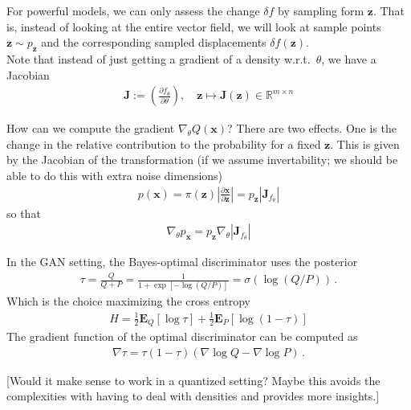 \documentclass{article}
\newcommand{\Edata}{\E_{P}}
\newcommand{\Emodel}{\E_{Q}}
\renewcommand{\Re}{{\mathbb R}}
\newcommand{\E}{{\mathbf E}}
\newcommand{\z}{{\mathbf z}}
\newcommand{\x}{{\mathbf x}}
\begin{document}
For powerful models, we can only assess the change $\delta f$ by sampling form $\z$. That is, instead of looking at the entire vector field, we will look at sample points $\z \sim p_\z$ and the corresponding sampled displacements $\delta f(\z)$.\\

Note that instead of just getting a gradient of a density w.r.t.~$\theta$, we have a Jacobian
\begin{align}
\mathbf J := \left( \frac{\partial f_\theta}{\partial \theta} \right), \quad \z \mapsto \mathbf J(\z) \in \Re^{m \times n}
\end{align} 

How can we compute the gradient $\nabla_\theta Q(\x)$? There are two effects. One is the change in the relative contribution to the probability for a fixed $\z$. This is given by the Jacobian of the transformation (if we assume invertability; we should be able to do this with extra noise dimensions)
\begin{align}
p(\x) = \pi(\z) \left| \frac{\partial \x}{\partial \z} \right| = p_\z \left| \mathbf J_{f_\theta} \right|
\end{align}
so that 
\begin{align}
\nabla_\theta p_\x = p_\z \nabla_\theta \left| \mathbf J_{f_\theta} \right|
\end{align}


\newpage

In the GAN setting, the Bayes-optimal discriminator uses the posterior
\begin{align}
\tau =  \frac{Q}{Q+P} = \frac{1}{1+ \exp\left[ - \log (Q/P) \right]} = \sigma\left(\log (Q/P) \right) \,.
\end{align}
Which is the choice maximizing the cross entropy
\begin{align}
H = \frac 12 \Emodel \left[ \log \tau  \right] + \frac 12 \Edata \left[ \log (1-\tau) \right]
\end{align}
The gradient function of the optimal discriminator can be computed as 
\begin{align}
\nabla \tau = \tau (1-\tau) \left( \nabla \log Q - \nabla \log P \right)  \,.
\end{align}

[Would it make sense to work in a quantized setting? Maybe this avoids the complexities with having to deal with densities and provides more insights.]\\
\end{document}
